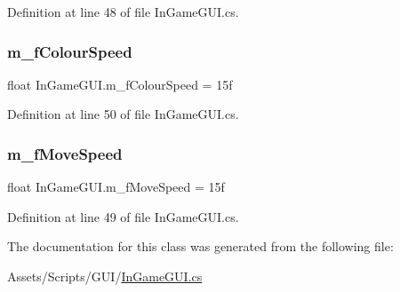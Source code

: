Definition at line 48 of file In\+Game\+G\+U\+I.\+cs.

\mbox{\label{class_in_game_g_u_i_a2324993de9dd4fa25a4ae3d2f86b8a86}} 
\subsubsection{\texorpdfstring{m\+\_\+f\+Colour\+Speed}{m\_fColourSpeed}}
{\footnotesize\ttfamily float In\+Game\+G\+U\+I.\+m\+\_\+f\+Colour\+Speed = 15f}



Definition at line 50 of file In\+Game\+G\+U\+I.\+cs.

\mbox{\label{class_in_game_g_u_i_a713c3c56cb7dc6c2063d9fa1c50f582f}} 
\subsubsection{\texorpdfstring{m\+\_\+f\+Move\+Speed}{m\_fMoveSpeed}}
{\footnotesize\ttfamily float In\+Game\+G\+U\+I.\+m\+\_\+f\+Move\+Speed = 15f}



Definition at line 49 of file In\+Game\+G\+U\+I.\+cs.



The documentation for this class was generated from the following file\+:\begin{DoxyCompactItemize}
\item 
Assets/\+Scripts/\+G\+U\+I/\mbox{\hyperlink{_in_game_g_u_i_8cs}{In\+Game\+G\+U\+I.\+cs}}\end{DoxyCompactItemize}
